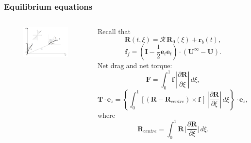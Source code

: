 \documentclass{beamer}
\begin{document}
\begin{frame}
	\frametitle{Equilibrium equations}
	\begin{overlayarea}{\textwidth}{\textheight}
\begin{columns}
	\begin{figure}[htb]
		\begin{center}
			\includegraphics[width=1\textwidth]{plots/r0.png}
		\end{center}
	\end{figure}
\footnotesize Recall that 
\begin{equation*}
	\textbf{R}(t,\xi)=\mathbf{\mathcal{R}}\,\textbf{R}_0(\xi)+\textbf{r}_b(t),
\end{equation*}
\begin{equation*}
	\textbf{f}_{f}=\left(\mathbf{I}-\frac{1}{2}\textbf{e}_t\textbf{e}_t\right)\cdot(\textbf{U}^{\infty}-\textbf{U}).
\end{equation*}
	\footnotesize
	Net drag and net torque: 
	\begin{equation*}
		\label{eqn:52}
		\textbf{F}=\int^1_0 \textbf{f}\, \left|\frac{\partial\textbf{R}}{\partial\xi}\right|\,d\xi, 
	\end{equation*}
	\begin{equation*}
		\label{eqn:53}
		\mathbf{T}\cdot\textbf{e}_z=\left\{\int^1_0 \left[(\textbf{R}-\textbf{R}_{centre})\times \textbf{f}\,\right]\,\left|\frac{\partial\textbf{R}}{\partial\xi}\right|\,d\xi\right\}\cdot\textbf{e}_z,
	\end{equation*}
	where 
	\begin{equation*}
		\label{eqn:54}
		\textbf{R}_{centre}=\int^1_0 \textbf{R}\,\Big|\frac{\partial\textbf{R}}{\partial\xi}\Big|\,d\xi.
	\end{equation*}
\vspace{0.1cm}


\end{columns}
\end{overlayarea}
\end{frame}
\end{document}
